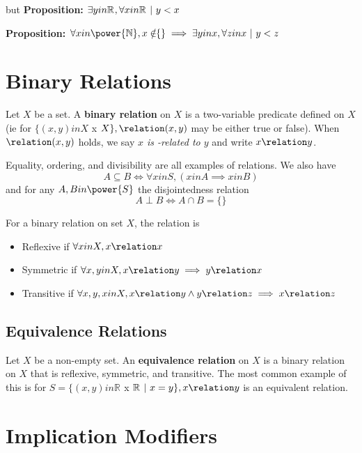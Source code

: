 \documentclass[12pt]{article}
\newcommand{\R}[1]{\mathbb{R}^{#1}}
\newcommand{\proposition}[1]{{\bf Proposition: \textit{#1}}}
\begin{document}
but
\proposition{$\exists y in \R{}, \forall x in \R{} \suchthat y < x$}


\proposition{$\forall x in \power{\mathbb{N}}, x \notin\!\!\{\} \implies \exists y in x, \forall z in x \suchthat y < z$}


\section*{Binary Relations}
Let $X$ be a set. A {\bf binary relation} on $X$ is a two-variable predicate \relation defined on $X$ (ie for $\{ (x,y) in X$ x $X \}, \relation (x,y)$ may be either true or false). When $\relation (x,y)$ holds, we say \emph{$x$ is \relation -related to $y$} and write $x \relation y$.

Equality, ordering, and divisibility are all examples of relations. We also have \[ A \subseteq B \iff \forall x in S, (x in A \implies x in B) \] and for any $A, B in \power{S}$ the disjointedness relation \[ A \perp B \iff A \cap B = \{ \} \]

For a binary relation on set $X$, the relation is
\begin{itemize}
\item Reflexive if $\forall x in X, x \relation x$
\item Symmetric if $\forall x, y in X, x \relation y \implies y \relation x$
\item Transitive if $\forall x, y, x in X, x \relation y \land y \relation z \implies x \relation z$
\end{itemize}

\subsection*{Equivalence Relations}
Let $X$ be a non-empty set. An {\bf equivalence relation} on $X$ is a binary relation on $X$ that is reflexive, symmetric, and transitive. The most common example of this is for $S = \{ (x,y) in \R{}$ x $\R{} \suchthat x = y \}, x \relation y$ is an equivalent relation.

\section*{Implication Modifiers}
\end{document}
